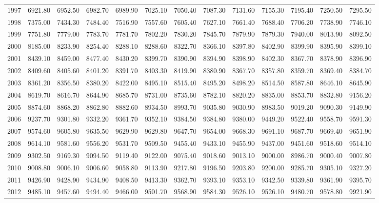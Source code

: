\begin{longtable}{rrrrrrrrrrrrr}
  1997 & 6921.80 & 6952.50 & 6982.70 & 6989.90 & 7025.10 & 7050.40 & 7087.30 & 7131.60 & 7155.30 & 7195.40 & 7250.50 & 7295.50 \\ 
  1998 & 7375.00 & 7434.30 & 7484.40 & 7516.90 & 7557.60 & 7605.40 & 7627.10 & 7661.40 & 7688.40 & 7706.20 & 7738.90 & 7746.10 \\ 
  1999 & 7751.80 & 7779.00 & 7783.70 & 7781.70 & 7802.20 & 7830.20 & 7845.70 & 7879.90 & 7879.30 & 7940.00 & 8013.90 & 8092.50 \\ 
  2000 & 8185.00 & 8233.90 & 8254.40 & 8288.10 & 8288.60 & 8322.70 & 8366.10 & 8397.80 & 8402.90 & 8399.90 & 8395.90 & 8399.10 \\ 
  2001 & 8439.10 & 8459.00 & 8477.40 & 8430.20 & 8399.70 & 8390.90 & 8394.90 & 8398.90 & 8402.30 & 8367.70 & 8378.90 & 8396.90 \\ 
  2002 & 8409.60 & 8405.60 & 8401.20 & 8391.70 & 8403.30 & 8419.90 & 8380.90 & 8367.70 & 8357.80 & 8359.70 & 8369.40 & 8384.70 \\ 
  2003 & 8361.20 & 8356.50 & 8380.20 & 8422.00 & 8495.10 & 8515.40 & 8495.20 & 8498.20 & 8514.50 & 8587.80 & 8646.10 & 8645.90 \\ 
  2004 & 8619.70 & 8616.70 & 8644.90 & 8685.70 & 8731.00 & 8735.60 & 8782.10 & 8820.20 & 8835.00 & 8853.70 & 8832.80 & 9156.20 \\ 
  2005 & 8874.60 & 8868.20 & 8862.80 & 8882.60 & 8934.50 & 8993.70 & 9035.80 & 9030.90 & 8983.50 & 9019.20 & 9090.30 & 9149.90 \\ 
  2006 & 9237.70 & 9301.80 & 9332.20 & 9361.70 & 9352.10 & 9384.50 & 9384.80 & 9380.00 & 9449.20 & 9522.40 & 9558.70 & 9591.30 \\ 
  2007 & 9574.60 & 9605.80 & 9635.50 & 9629.90 & 9629.80 & 9647.70 & 9654.00 & 9668.30 & 9691.10 & 9687.70 & 9669.40 & 9651.90 \\ 
  2008 & 9614.10 & 9581.60 & 9556.20 & 9531.70 & 9509.50 & 9455.40 & 9433.10 & 9455.90 & 9437.00 & 9451.60 & 9518.60 & 9514.10 \\ 
  2009 & 9302.50 & 9169.30 & 9094.50 & 9119.40 & 9122.00 & 9075.40 & 9018.60 & 9013.10 & 9000.00 & 8986.70 & 9000.40 & 9007.80 \\ 
  2010 & 9008.80 & 9006.10 & 9006.60 & 9058.80 & 9113.90 & 9217.80 & 9196.50 & 9203.80 & 9200.00 & 9285.70 & 9305.10 & 9327.20 \\ 
  2011 & 9426.90 & 9428.90 & 9434.90 & 9408.50 & 9413.30 & 9362.70 & 9393.10 & 9353.10 & 9342.50 & 9339.80 & 9361.90 & 9395.70 \\ 
  2012 & 9485.10 & 9457.60 & 9494.40 & 9466.00 & 9501.70 & 9568.90 & 9584.30 & 9526.10 & 9526.10 & 9480.70 & 9578.80 & 9921.90 \\ 

\end{longtable}
